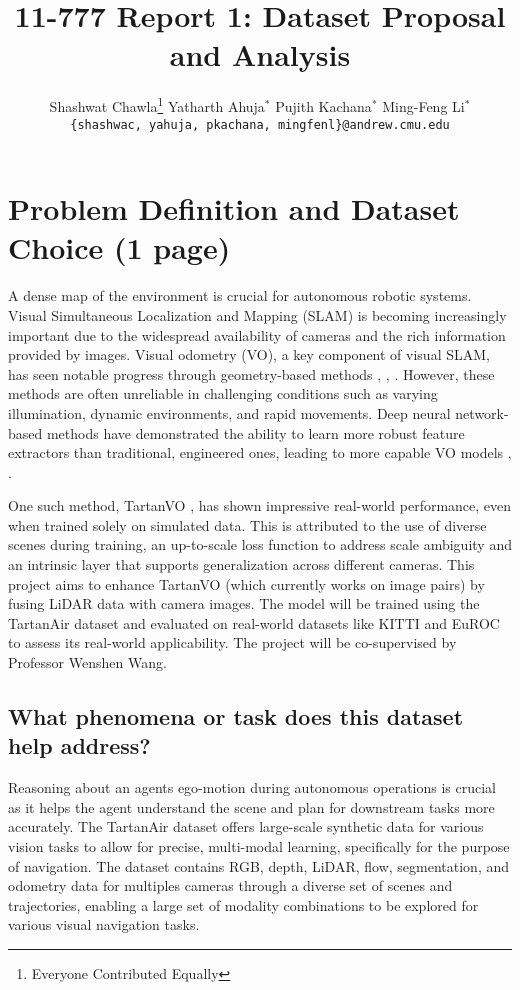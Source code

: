 \documentclass[11pt,a4paper]{article}
\title{11-777 Report 1: Dataset Proposal and Analysis}
\author{
  Shashwat Chawla\thanks{\hspace{4pt}Everyone Contributed Equally} \hspace{2em} Yatharth Ahuja$^*$ \hspace{2em} Pujith Kachana$^*$ \hspace{2em} Ming-Feng Li$^*$ \\
  \texttt{\{shashwac, yahuja, pkachana, mingfenl\}@andrew.cmu.edu}
  }
\date{}
\begin{document}
\maketitle

\section{Problem Definition and Dataset Choice (1 page)}
A dense map of the environment is crucial for autonomous robotic systems. Visual Simultaneous Localization and Mapping (SLAM) is becoming increasingly important due to the widespread availability of cameras and the rich information provided by images. Visual odometry (VO), a key component of visual SLAM, has seen notable progress through geometry-based methods \cite{lsd-slam}, \cite{orb-slam}, \cite{spa-odom}. However, these methods are often unreliable in challenging conditions such as varying illumination, dynamic environments, and rapid movements. Deep neural network-based methods have demonstrated the ability to learn more robust feature extractors than traditional, engineered ones, leading to more capable VO models \cite{vo-dnn}, \cite{sfm-net}. 

One such method, TartanVO \cite{tartanvo2020corl}, has shown impressive real-world performance, even when trained solely on simulated data. This is attributed to the use of diverse scenes during training, an up-to-scale loss function to address scale ambiguity and an intrinsic layer that supports generalization across different cameras. This project aims to enhance TartanVO (which currently works on image pairs) by fusing LiDAR data with camera images. The model will be trained using the TartanAir dataset and evaluated on real-world datasets like KITTI and EuROC to assess its real-world applicability. The project will be co-supervised by Professor Wenshen Wang.


\subsection{What phenomena or task does this dataset help address?}
Reasoning about an agents ego-motion during autonomous operations is crucial as it helps the agent understand the scene and plan for downstream tasks more accurately. %
The TartanAir dataset offers large-scale synthetic data for various vision tasks to allow for precise, multi-modal learning, specifically for the purpose of navigation. The dataset contains RGB, depth, LiDAR, flow, segmentation, and odometry data for multiples cameras through a diverse set of scenes and trajectories, enabling a large set of modality combinations to be explored for various visual navigation tasks.
\end{document}

